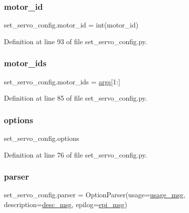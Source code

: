 \subsubsection{\texorpdfstring{motor\+\_\+id}{motor\_id}}
{\footnotesize\ttfamily set\+\_\+servo\+\_\+config.\+motor\+\_\+id = int(motor\+\_\+id)}



Definition at line 93 of file set\+\_\+servo\+\_\+config.\+py.

\mbox{\label{namespaceset__servo__config_a2c4d55fcec026b0598d2bc6c6079e7fc}} 
\subsubsection{\texorpdfstring{motor\+\_\+ids}{motor\_ids}}
{\footnotesize\ttfamily set\+\_\+servo\+\_\+config.\+motor\+\_\+ids = \hyperlink{namespaceset__servo__config_a938193d08b751c10549aa8a48cb96402}{args}\mbox{[}1\+:\mbox{]}}



Definition at line 85 of file set\+\_\+servo\+\_\+config.\+py.

\mbox{\label{namespaceset__servo__config_ac255726a992a254f0b0e6072b0f86233}} 
\subsubsection{\texorpdfstring{options}{options}}
{\footnotesize\ttfamily set\+\_\+servo\+\_\+config.\+options}



Definition at line 76 of file set\+\_\+servo\+\_\+config.\+py.

\mbox{\label{namespaceset__servo__config_a31cf164b74aedc9fbcd68b74615b6ac2}} 
\subsubsection{\texorpdfstring{parser}{parser}}
{\footnotesize\ttfamily set\+\_\+servo\+\_\+config.\+parser = Option\+Parser(usage=\hyperlink{namespaceset__servo__config_afb62a54e4938e903420f62984507fdd8}{usage\+\_\+msg}, description=\hyperlink{namespaceset__servo__config_a8e653627e0edc71d67503af40c92f022}{desc\+\_\+msg}, epilog=\hyperlink{namespaceset__servo__config_a5c22d68865380f08b6c332373297893a}{epi\+\_\+msg})}



